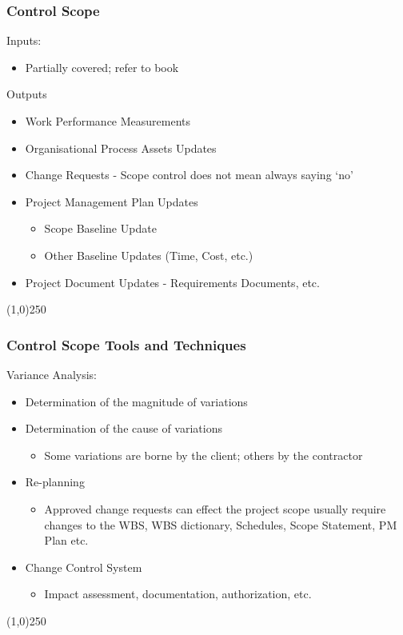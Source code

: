 \begin{frame}
\frametitle{Control Scope}
Inputs:
\begin{itemize}
	\item Partially covered; refer to book
\end{itemize}
Outputs 
\begin{itemize}
	\item Work Performance Measurements
	\item Organisational Process Assets Updates
	\item Change Requests - Scope control does not mean always saying `no'
	\item Project Management Plan Updates
		\begin{itemize}
			\item Scope Baseline Update
			\item Other Baseline Updates (Time, Cost, etc.)
		\end{itemize}
	\item Project Document Updates - Requirements Documents, etc.
\end{itemize}
\end{frame}\begin{center}\line(1,0){250}\end{center}



\begin{frame}
\frametitle{Control Scope \hfill Tools and Techniques}
Variance Analysis:
\begin{itemize}
	\item Determination of the magnitude of variations
	\item Determination of the cause of variations
		\begin{itemize}
			\item Some variations are borne by the client; others by the contractor
		\end{itemize}
	\item Re-planning
		\begin{itemize}
			\item Approved change requests can effect the project scope usually require changes to the WBS, WBS dictionary, Schedules, Scope Statement, PM Plan etc.
		\end{itemize}
	\item Change Control System
		\begin{itemize}
			\item Impact assessment, documentation, authorization, etc.
		\end{itemize}
\end{itemize}
\end{frame}\begin{center}\line(1,0){250}\end{center}





